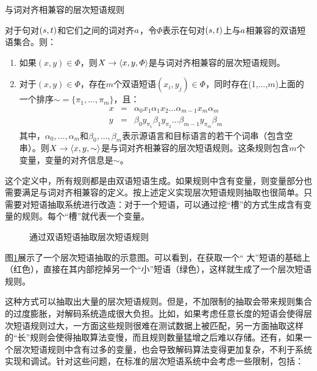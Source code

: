 \vspace{0.5em}
\begin{definition} 与词对齐相兼容的层次短语规则

{\small
对于句对$({s},{t})$和它们之间的词对齐${a}$，令$\varPhi$表示在句对$({s},{t})$上与${a}$相兼容的双语短语集合。则：
\begin{enumerate}
\item 	如果$(x,y)\in \varPhi$，则${X} \to \langle x,y,\varPhi \rangle$是与词对齐相兼容的层次短语规则。
\item 	对于$(x,y)\in \varPhi$，存在$m$个双语短语$(x_i,y_j)\in \varPhi$，同时存在(1,$...$,$m$)上面的一个排序$\sim = \{\pi_1 , ... ,\pi_m\}$，且：
\vspace{-1.5em}
\begin{eqnarray}
x&=&\alpha_0 x_1 \alpha_1 x_2 ... \alpha_{m-1} x_m \alpha_m \label{eq:8-2}\\
y&=&\beta_0 y_{\pi_1} \beta_1 y_{\pi_2} ... \beta_{m-1} y_{\pi_m} \beta_m
\label{eq:8-3}
\end{eqnarray}
其中，${\alpha_0, ... ,\alpha_m}$和${\beta_0, ... ,\beta_m}$表示源语言和目标语言的若干个词串（包含空串）。则${X} \to \langle x,y,\sim \rangle$是与词对齐相兼容的层次短语规则。这条规则包含$m$个变量，变量的对齐信息是$\sim$。
\end{enumerate}
}
\end{definition}

\parinterval 这个定义中，所有规则都是由双语短语生成。如果规则中含有变量，则变量部分也需要满足与词对齐相兼容的定义。按上述定义实现层次短语规则抽取也很简单。只需要对短语抽取系统进行改造：对于一个短语，可以通过挖“槽”的方式生成含有变量的规则。每个“槽”就代表一个变量。

\begin{figure}[htp]
\centering

\caption{通过双语短语抽取层次短语规则}
\label{fig:8-7}
\end{figure}

\parinterval 图\ref{fig:8-7}展示了一个层次短语抽取的示意图。可以看到，在获取一个“ 大”短语的基础上（红色），直接在其内部挖掉另一个“小”短语（绿色），这样就生成了一个层次短语规则。

\parinterval 这种方式可以抽取出大量的层次短语规则。但是，不加限制的抽取会带来规则集合的过度膨胀，对解码系统造成很大负担。比如，如果考虑任意长度的短语会使得层次短语规则过大，一方面这些规则很难在测试数据上被匹配，另一方面抽取这样的“长”规则会使得抽取算法变慢，而且规则数量猛增之后难以存储。还有，如果一个层次短语规则中含有过多的变量，也会导致解码算法变得更加复杂，不利于系统实现和调试。针对这些问题，在标准的层次短语系统中会考虑一些限制，包括：

